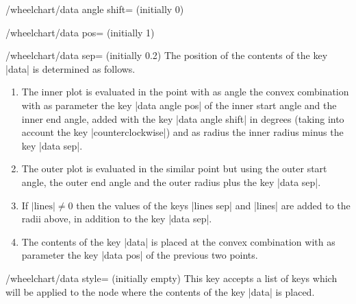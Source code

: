 \documentclass[a4paper,english,dvipsnames]{ltxdoc}
\begin{document}
\begin{key}{/wheelchart/data angle shift= (initially 0)}
\end{key}
\begin{key}{/wheelchart/data pos= (initially 1)}
\end{key}
\begin{key}{/wheelchart/data sep= (initially 0.2)}
The position of the contents of the key |data| is determined as follows.
\begin{enumerate}
\item The inner plot is evaluated in the point with as angle the convex combination with as parameter the key |data angle pos| of the inner start angle and the inner end angle, added with the key |data angle shift| in degrees (taking into account the key |counterclockwise|) and as radius the inner radius minus the key |data sep|.
\item The outer plot is evaluated in the similar point but using the outer start angle, the outer end angle and the outer radius plus the key |data sep|.
\item If $\text{|lines|}\neq 0$ then the values of the keys |lines sep| and |lines| are added to the radii above, in addition to the key |data sep|.
\item The contents of the key |data| is placed at the convex combination with as parameter the key |data pos| of the previous two points.
\end{enumerate}
\begin{codeexample}[]
\begin{tikzpicture}
\wheelchart[
    data angle pos{2}=0.3,
    data angle pos{6}=0.8,
    data angle shift{3}=-0.1,
    data angle shift{5}=0.1,
    data pos=\WClistB,
    data sep=0,
    lines{1,2,4,6,7}=0.5,
    lines{3,5}=1,
    lines angle pos{1}=0.8,
    lines angle shift{7}=-0.2,
    lines ext=\WClistA,
    lines ext dir{1,...,3}=left,
    lines ext dir{4,...,7}=right,
    lines ext fixed,
    lines ext fixed left=-1,
    lines ext fixed right=7,
    lines pos=\WClistB,
    lines sep=0.2*\WClistA,
    xbar={6}{1.5},
    WClistA={1,0},
    WClistB={0,1},
    wheel data=\WCperc,
    wheel data pos=0.5,
    wheel data pos{1}=1,
    wheel data pos{4}=0,
    wheel data sep=0.2
]{\exampleforthismanual}
\end{tikzpicture}
\end{codeexample}
\end{key}
\begin{stylekey}{/wheelchart/data style= (initially \normalfont empty)}
This key accepts a list of keys which will be applied to the node where the contents of the key |data| is placed.
\end{stylekey}
\end{document}
